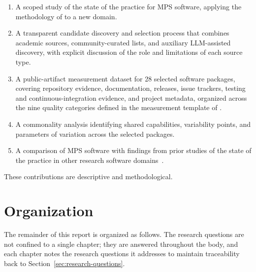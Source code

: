 \begin{enumerate}
    \item A scoped study of the state of the practice for MPS software, applying the methodology of \citet{Smith2021} to a new domain.
    \item A transparent candidate discovery and selection process that combines academic sources, community-curated lists, and auxiliary LLM-assisted discovery, with explicit discussion of the role and limitations of each source type.
    \item A public-artifact measurement dataset for 28 selected software packages, covering repository evidence, documentation, releases, issue trackers, testing and continuous-integration evidence, and project metadata, organized across the nine quality categories defined in the measurement template of \citet{Smith2021}.
    \item A commonality analysis identifying shared capabilities, variability points, and parameters of variation across the selected packages.
    \item A comparison of MPS software with findings from prior studies of the state of the practice in other research software domains~\citep{Smith2024LBM,Smith2024MI,Smith2018Seismology}.
\end{enumerate}

These contributions are descriptive and methodological.

\section{Organization}
\label{sec:organization}

The remainder of this report is organized as follows. The research questions are not confined to a single chapter; they are answered throughout the body, and each chapter notes the research questions it addresses to maintain traceability back to Section~\ref{sec:research-questions}.

